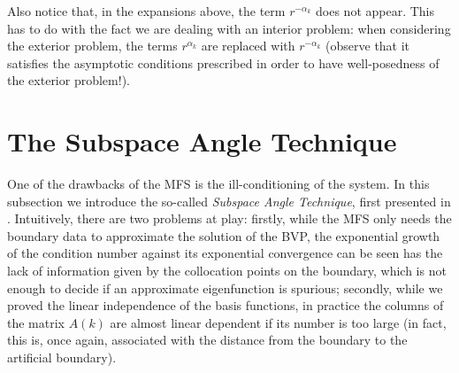\begin{remark}
    Also notice that, in the expansions above, the term \(r^{-\alpha_k}\) does not appear. This has to do with the fact we are dealing with an interior problem: when considering the exterior problem, the terms \(r^{\alpha_k}\) are replaced with \(r^{-\alpha_k}\) (observe that it satisfies the asymptotic conditions prescribed in order to have well-posedness of the exterior problem!).
\end{remark}

\section{The Subspace Angle Technique} \label{sat_appendix}

One of the drawbacks of the \ac{MFS} is the ill-conditioning of the system. In this subsection we introduce the so-called \textit{Subspace Angle Technique}, first presented in \cite{betcke2005reviving}. Intuitively, there are two problems at play: firstly, while the \ac{MFS} only needs the boundary data to approximate the solution of the \ac{BVP}, the exponential growth of the condition number against its exponential convergence can be seen has the lack of information given by the collocation points on the boundary, which is not enough to decide if an approximate eigenfunction is spurious; secondly, while we proved the linear independence of the basis functions, in practice the columns of the matrix \(A(k)\) are almost linear dependent if its number is too large (in fact, this is, once again, associated with the distance from the boundary to the artificial boundary).


